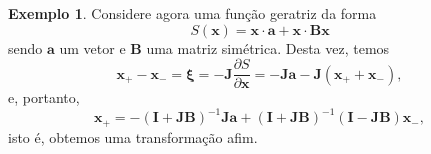 \documentclass[
	12pt,
	oneside,			%
	a4paper,			%
	english,			%
	brazil				%
	]{abntex2}
\theoremstyle{definition}
\newtheorem{exmp}{Exemplo}[chapter]
\begin{document}
\begin{exmp}
    Considere agora uma função geratriz da forma
    \begin{equation}
        S(\mathbf{x}) = \mathbf{x} \cdot \mathbf{a} + \mathbf{x} \cdot \mathbf{B}\mathbf{x}
    \end{equation}
    sendo $\mathbf{a}$ um vetor e $\mathbf{B}$ uma matriz simétrica. Desta vez, temos
    \begin{equation}
        \mathbf{x}_+ - \mathbf{x}_- = \boldsymbol{\xi} = -\mathbf{J} \frac{\partial S}{\partial \mathbf{x}} = -\mathbf{J} \mathbf{a}  -\mathbf{J} \left(\mathbf{x}_+ + \mathbf{x}_-\right),
    \end{equation}
    e, portanto,
    \begin{equation}
        \mathbf{x}_+ = -\left(\mathbf{I} + \mathbf{J}\mathbf{B}\right)^{-1} \mathbf{J} \mathbf{a} + \left(\mathbf{I} + \mathbf{J}\mathbf{B}\right)^{-1}\left(\mathbf{I} - \mathbf{J}\mathbf{B}\right)\mathbf{x}_-,
    \end{equation}
    isto é, obtemos uma transformação afim.


\end{exmp}
\end{document}
